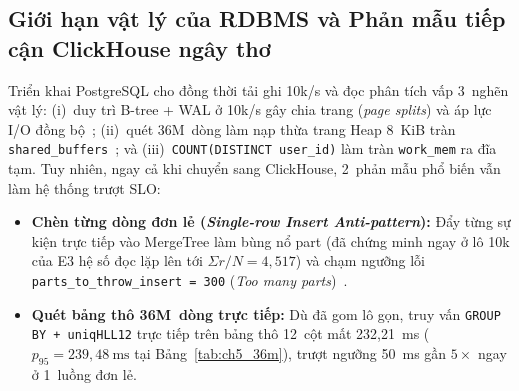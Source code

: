 \documentclass[13pt,a4paper]{report}
\begin{document}
\subsection{Giới hạn vật lý của RDBMS và Phản mẫu tiếp cận ClickHouse ngây thơ}
Triển khai PostgreSQL cho đồng thời tải ghi 10k/s và đọc phân tích vấp 3~nghẽn vật lý: (i)~duy trì B-tree + WAL ở 10k/s gây chia trang (\textit{page splits}) và áp lực I/O đồng bộ~\cite{P8}; (ii)~quét 36M~dòng làm nạp thừa trang Heap 8~KiB tràn \texttt{shared\_\allowbreak{}buffers}~\cite{P1}; và (iii)~\texttt{COUNT(\allowbreak{}DISTINCT user\_\allowbreak{}id)} làm tràn \texttt{work\_\allowbreak{}mem} ra đĩa tạm. Tuy nhiên, ngay cả khi chuyển sang ClickHouse, 2~phản mẫu phổ biến vẫn làm hệ thống trượt SLO:
\begin{itemize}
    \setlength{\itemsep}{2pt}\setlength{\parskip}{0pt}
    \item \textbf{Chèn từng dòng đơn lẻ (\textit{Single-row Insert Anti-pattern}):} Đẩy từng sự kiện trực tiếp vào MergeTree làm bùng nổ part (đã chứng minh ngay ở lô 10k của E3 hệ số đọc lặp lên tới $\Sigma r / N = 4{,}517$) và chạm ngưỡng lỗi \texttt{parts\_\allowbreak{}to\_\allowbreak{}throw\_\allowbreak{}insert = 300} (\textit{Too many parts})~\cite{S13}.
    \item \textbf{Quét bảng thô 36M~dòng trực tiếp:} Dù đã gom lô gọn, truy vấn \texttt{GROUP BY + uniqHLL12} trực tiếp trên bảng thô 12~cột mất 232,21~ms ($p_{95} = 239{,}48~\text{ms}$ tại Bảng~\ref{tab:ch5_36m}), trượt ngưỡng 50~ms gần $5{\times}$ ngay ở 1~luồng đơn lẻ.
\end{itemize}
\end{document}
